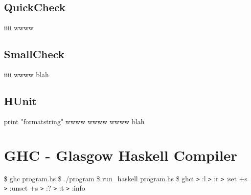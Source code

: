 \documentclass{refcard}
\begin{document}
\subsection{QuickCheck \hfill {}}

\begin{ldesc}
	\li[iiii] iiii
	\li[wwww] wwww
\end{ldesc}

\subsection{SmallCheck \hfill {}}

\begin{ldesc}
	\li[iiii] iiii
	\li       wwww
	\li[blah] blah
\end{ldesc}


\subsection{HUnit \hfill {}}

\begin{ldesc}
	\li[printing] print "formatstring"
	\li[wwww] wwww
	\li[iiii] wwww
	\li       wwww
	\li[blah] blah
\end{ldesc}


\section{GHC - Glasgow Haskell Compiler}

\begin{ldesc}
	 \$ ghc program.hs
	\li[running]                  \$ ./program
	         \$ run\_haskell program.hs
	  \$ ghci
	                \verb+>+ :l 
	              \verb+>+ :r 
	      \verb+>+ :set +s
	      \verb+>+ :unset +s
	                \verb+>+ :?
	    \verb+>+ :t 
	 \verb+>+ :info 
\end{ldesc}
\end{document}
